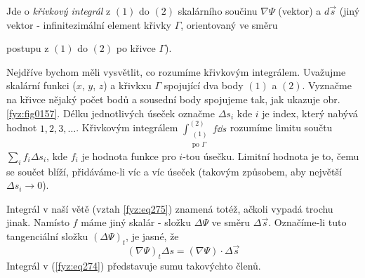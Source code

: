       Jde o \emph{křivkový integrál} z \((1)\) do \((2)\) skalárního součinu \(\nabla\Psi\) (vektor)
      a \(d\vec{s}\) (jiný vektor - infinitezimální element křivky \(\Gamma\), orientovaný ve směru
      
      postupu z \((1)\) do \((2)\) po křivce \(\Gamma\)).
      
      Nejdříve bychom měli vysvětlit, co rozumíme křivkovým integrálem. Uvažujme skalární funkci 
      (\(x\), \(y\), \(z\)) a křivkxu \(\Gamma\) spojující dva body \((1)\) a \((2)\). Vyznačme na 
      křivce nějaký počet bodů a sousední body spojujeme tak, jak ukazuje obr.  \ref{fyz:fig0157}. 
      Délku jednotlivých úseček označme \(\Delta s_i\) kde \(i\) je index, který nabývá hodnot 
      \(1,2,3,\ldots\). Křivkovým integrálem \(\displaystyle\int_{\substack{(1)\\\text{po 
      }\Gamma}}^{(2)}f\dd{s}\) rozumíme limitu součtu \(\displaystyle\sum_i f_i\Delta s_i\), kde 
      \(f_i\) je hodnota funkce pro \(i\)-tou úsečku. Limitní hodnota je to, čemu se součet blíží, 
      přidáváme-li víc a víc úseček (takovým způsobem, aby největší \(\Delta s_i\rightarrow 0\)).
      
      Integrál v naší větě (vztah \ref{fyz:eq275}) znamená totéž, ačkoli vypadá trochu jinak.
      Namísto \(f\) máme jiný skalár - složku \(\Delta\Psi\) ve směru \(\Delta\vec{s}\). Označíme-li
      tuto tangenciální složku \((\Delta\Psi)_t\), je jasné, že
      \begin{equation}\label{fyz:eq274}
        (\nabla\Psi)_t\Delta s = (\nabla\Psi)\cdot\Delta\vec{s}
      \end{equation}
      Integrál v (\ref{fyz:eq274}) představuje sumu takovýchto členů.
      
